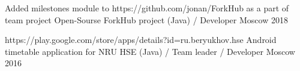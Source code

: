 \begin{cventries}
	
	\cventry
	{Added milestones module to https://github.com/jonan/ForkHub as a part of team project} %
	{Open-Sourse ForkHub project (Java) / Developer} %
	{Moscow} %
	{2018} %
	{}
	
	
	\cventry
	{https://play.google.com/store/apps/details?id=ru.beryukhov.hse} %
	{Android timetable application for NRU HSE (Java) / Team leader / Developer} %
	{Moscow} %
	{2016} %
	{}
	
	
	
	
	
	
	
	
	
	

\end{cventries}
